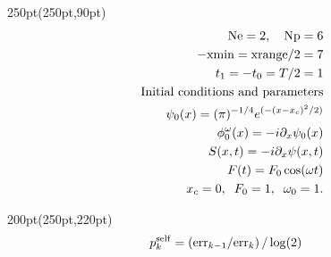 \begin{frame}
\begin{textblock*}{250pt}(250pt,90pt)
	\begin{align}
         {\rm Ne} = 2,\hspace{10pt} {\rm Np}  = 6 &\nonumber\\
		-{\rm xmin} = {\rm xrange}/2  = 7 &\nonumber\\
		             t_1 = -t_0 = T/2 = 1 &\nonumber\\
	  \mbox{Initial conditions and parameters}&\nonumber\\
       \psi_0(x) = (\pi)^{-1/4}e^{(-(x-x_c)^2/2)} &\nonumber\\
	 \phi^\omega_0(x) = -i\partial_x \psi_0(x)&\nonumber\\
		    S(x,t) = -i\partial_x\psi(x,t)&\nonumber\\
		          F(t) = F_0\cos(\omega t)&\nonumber\\
		      x_c = 0,\;\;F_0 = 1,\;\;\omega_0 = 1. \nonumber
         \end{align}
\end{textblock*}
\begin{textblock*}{200pt}(250pt,220pt)
	\begin{align}
	p_k^{\rm self} & = \left({\rm err}_{k-1}/{\rm err}_{k}\right)/\log(2) \nonumber
	\end{align}

\end{textblock*}


\end{frame}






